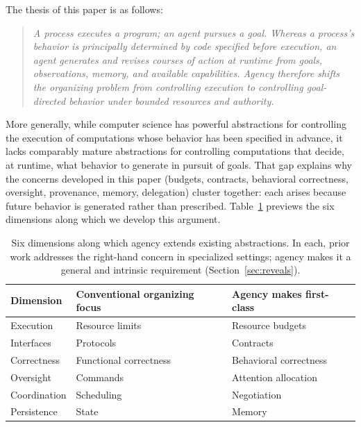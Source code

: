 \documentclass[11pt]{article}
\begin{document}
The thesis of this paper is as follows:

\begin{quote}
\itshape A process executes a program; an agent pursues a goal. Whereas a process's behavior is principally determined by code specified before execution, an agent generates and revises courses of action at runtime from goals, observations, memory, and available capabilities. Agency therefore shifts the organizing problem from controlling execution to controlling goal-directed behavior under bounded resources and authority.
\end{quote}

More generally, while computer science has powerful abstractions for controlling the execution of computations whose behavior has been specified in advance, it lacks comparably mature abstractions for controlling computations that decide, at runtime, what behavior to generate in pursuit of goals. That gap explains why the concerns developed in this paper (budgets, contracts, behavioral correctness, oversight, provenance, memory, delegation) cluster together: each arises because future behavior is generated rather than prescribed. Table~\ref{tab:transitions} previews the six dimensions along which we develop this argument.

\begin{table}[t]
\centering
\caption{Six dimensions along which agency extends existing abstractions. In each, prior work addresses the right-hand concern in specialized settings; agency makes it a general and intrinsic requirement (Section~\ref{sec:reveals}).}
\vspace{1ex}
\label{tab:transitions}
\begin{tabular}{lll}
\hline
\textbf{Dimension} & \textbf{Conventional organizing focus} & \textbf{Agency makes first-class} \\
\hline
Execution & Resource limits & Resource budgets \\
Interfaces & Protocols & Contracts \\
Correctness & Functional correctness & Behavioral correctness \\
Oversight & Commands & Attention allocation \\
Coordination & Scheduling & Negotiation \\
Persistence & State & Memory \\
\hline
\end{tabular}
\end{table}
\end{document}
